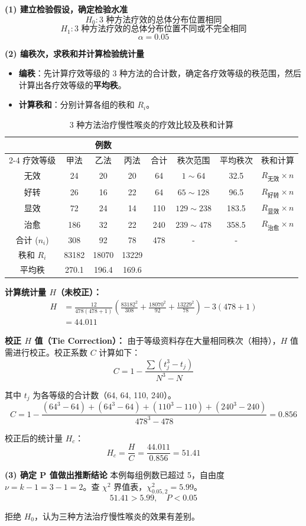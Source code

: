 \documentclass[lang=cn,10pt]{elegantbook}
\begin{document}
\vspace{0.2cm}
\begin{solution}
\textbf{(1) 建立检验假设，确定检验水准}
\[
H_0: \text{3 种方法疗效的总体分布位置相同}
\]
\[
H_1: \text{3 种方法疗效的总体分布位置不同或不完全相同}
\]
\[
\alpha = 0.05
\]

\textbf{(2) 编秩次，求秩和并计算检验统计量}
\begin{itemize}
    \item \textbf{编秩}：先计算疗效等级的 3 种方法的合计数，确定各疗效等级的秩范围，然后计算出各疗效等级的\textbf{平均秩}。
    \item \textbf{计算秩和}：分别计算各组的秩和 $R_i$。
\end{itemize}

\begin{table}[htbp]
\centering
\caption{3 种方法治疗慢性喉炎的疗效比较及秩和计算}
\begin{tabular}{cccccccc}
\toprule
& \multicolumn{3}{c}{例数} & & & & \\
\cmidrule(lr){2-4}
疗效等级 & 甲法 & 乙法 & 丙法 & 合计 & 秩次范围 & 平均秩次 & 秩和计算 \\
\midrule
无效 & 24 & 20 & 20 & 64 & $1 \sim 64$ & 32.5 & $R_{\text{无效}} \times n$ \\
好转 & 26 & 16 & 22 & 64 & $65 \sim 128$ & 96.5 & $R_{\text{好转}} \times n$ \\
显效 & 72 & 24 & 14 & 110 & $129 \sim 238$ & 183.5 & $R_{\text{显效}} \times n$ \\
治愈 & 186 & 32 & 22 & 240 & $239 \sim 478$ & 358.5 & $R_{\text{治愈}} \times n$ \\
\midrule
合计 ($n_i$) & 308 & 92 & 78 & 478 & - & - & \\
秩和 $R_i$ & 83182 & 18070 & 13229 & & & & \\
平均秩 & 270.1 & 196.4 & 169.6 & & & & \\
\bottomrule
\end{tabular}
\end{table}

\textbf{计算统计量 $H$（未校正）：}
\[
\begin{aligned}
H &= \frac{12}{478(478+1)} \left( \frac{83182^2}{308} + \frac{18070^2}{92} + \frac{13229^2}{78} \right) - 3(478+1) \\
&= 44.011
\end{aligned}
\]

\textbf{校正 $H$ 值（Tie Correction）：}
由于等级资料存在大量相同秩次（相持），$H$ 值需进行校正。校正系数 $C$ 计算如下：
\[
C = 1 - \frac{\sum (t_j^3 - t_j)}{N^3 - N}
\]

其中 $t_j$ 为各等级的合计数（64, 64, 110, 240）。
\[
C = 1 - \frac{(64^3-64) + (64^3-64) + (110^3-110) + (240^3-240)}{478^3 - 478} = 0.856
\]

校正后的统计量 $H_c$：
\[
H_c = \frac{H}{C} = \frac{44.011}{0.856} = 51.41
\]

\textbf{(3) 确定 P 值做出推断结论}
本例每组例数已超过 5，自由度 $\nu = k-1 = 3-1 = 2$。查 $\chi^2$ 界值表，$\chi^2_{0.05, 2} = 5.99$。
\[
51.41 > 5.99, \quad P < 0.05
\]

拒绝 $H_0$，认为三种方法治疗慢性喉炎的效果有差别。
\end{solution}
\end{document}
